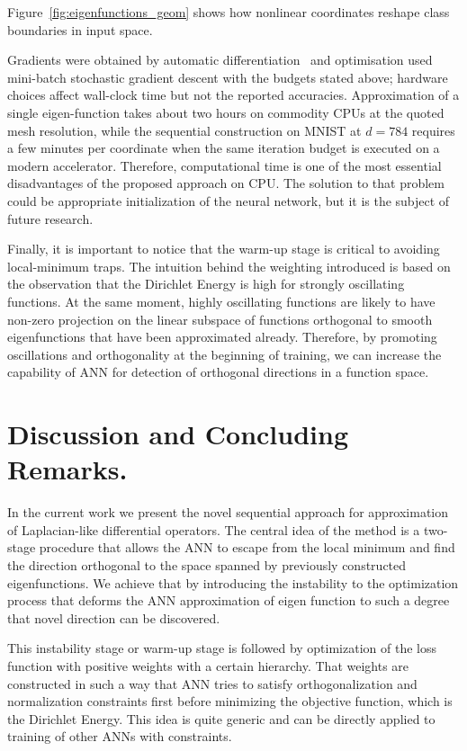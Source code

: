 \documentclass{article}
\theoremstyle{plain}
\theoremstyle{definition}
\theoremstyle{remark}
\newcommand{\new}[1]{#1}
\begin{document}
Figure~\ref{fig:eigenfunctions_geom} shows how nonlinear coordinates reshape class boundaries in input space.

\new{Gradients were obtained by automatic differentiation~\cite{NEURIPS2019_9015} and optimisation used mini-batch stochastic gradient descent with the budgets stated above; hardware choices affect wall-clock time but not the reported accuracies.
Approximation of a single eigen-function takes about two hours on commodity CPUs at the quoted mesh resolution,
while the sequential construction on MNIST at $d{=}784$ requires a few minutes per coordinate when the same iteration budget is executed on a modern accelerator.}
Therefore, computational time is one of the most essential disadvantages of the proposed approach on CPU.
The solution to that problem could be appropriate initialization of the neural network,
but it is the subject of future research.

Finally, it is important to notice that the warm-up stage is critical to
avoiding local-minimum traps.
The intuition behind the weighting introduced is based on the observation that the Dirichlet Energy
is high for strongly oscillating functions. At the same moment, highly oscillating functions
are likely to have non-zero projection on the linear subspace of functions orthogonal to smooth eigenfunctions
that have been approximated already. Therefore, by promoting oscillations and orthogonality at the beginning of training,
we can increase the capability of ANN for detection of orthogonal directions in a function space.


\section{Discussion and Concluding Remarks.}
\label{sec:conclusion}
In the current work we present the novel sequential approach for approximation of Laplacian-like differential operators.
The central idea of the method is a two-stage procedure that allows the ANN to escape from the local minimum and
find the direction orthogonal to the space spanned by previously constructed eigenfunctions.
We achieve that by introducing the instability to the optimization process that deforms
the ANN approximation of eigen function to such a degree that novel direction can be discovered.

This instability stage or warm-up stage is followed by optimization of the loss function with positive weights with a certain hierarchy.
That weights are constructed in such a way that ANN tries to satisfy orthogonalization and normalization constraints first
before minimizing the objective function, which is the Dirichlet Energy.
This idea is quite generic and can be directly applied to training of other ANNs with constraints.
\end{document}
